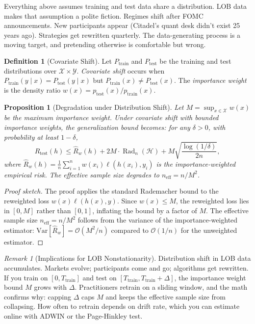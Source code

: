 \documentclass[11pt]{article}
\newtheorem{proposition}[theorem]{Proposition}
\theoremstyle{definition}
\newtheorem{definition}[theorem]{Definition}
\theoremstyle{remark}
\newtheorem{remark}[theorem]{Remark}
\newcommand{\cH}{\mathcal{H}}
\newcommand{\cO}{\mathcal{O}}
\newcommand{\cX}{\mathcal{X}}
\newcommand{\cY}{\mathcal{Y}}
\DeclareMathOperator{\Rad}{Rad}
\begin{document}
Everything above assumes training and test data share a distribution.
LOB data makes that assumption a polite fiction.
Regimes shift after FOMC announcements.
New participants appear (Citadel's quant desk didn't exist 25 years ago).
Strategies get rewritten quarterly.
The data-generating process is a moving target, and pretending otherwise is comfortable but wrong.

\begin{definition}[Covariate Shift]\label{def:covariate_shift}
Let $P_{\mathrm{train}}$ and $P_{\mathrm{test}}$ be the training and test distributions over $\cX \times \cY$.
\emph{Covariate shift} occurs when $P_{\mathrm{train}}(y \mid x) = P_{\mathrm{test}}(y \mid x)$ but $P_{\mathrm{train}}(x) \neq P_{\mathrm{test}}(x)$.
The \emph{importance weight} is the density ratio $w(x) = p_{\mathrm{test}}(x) / p_{\mathrm{train}}(x)$.
\end{definition}

\begin{proposition}[Degradation under Distribution Shift]\label{prop:shift}
Let $M = \sup_{x \in \cX} w(x)$ be the maximum importance weight.
Under covariate shift with bounded importance weights, the generalization bound becomes: for any $\delta > 0$, with probability at least $1 - \delta$,
\[
    R_{\mathrm{test}}(h) \leq \hat{R}_w(h) + 2M \cdot \Rad_n(\cH) + M\sqrt{\frac{\log(1/\delta)}{2n}},
\]
where $\hat{R}_w(h) = \frac{1}{n}\sum_{i=1}^n w(x_i) \ell(h(x_i), y_i)$ is the importance-weighted empirical risk.
The effective sample size degrades to $n_{\mathrm{eff}} = n / M^2$.
\end{proposition}

\begin{proof}[Proof sketch]
The proof applies the standard Rademacher bound to the reweighted loss $w(x)\ell(h(x),y)$.
Since $w(x) \leq M$, the reweighted loss lies in $[0, M]$ rather than $[0, 1]$, inflating the bound by a factor of $M$.
The effective sample size $n_{\mathrm{eff}} = n/M^2$ follows from the variance of the importance-weighted estimator: $\mathrm{Var}[\hat{R}_w] = \cO(M^2/n)$ compared to $\cO(1/n)$ for the unweighted estimator.
\end{proof}

\begin{remark}[Implications for LOB Nonstationarity]
Distribution shift in LOB data accumulates.
Markets evolve; participants come and go; algorithms get rewritten.
If you train on $[0, T_{\mathrm{train}}]$ and test on $[T_{\mathrm{train}}, T_{\mathrm{train}} + \Delta]$, the importance weight bound $M$ grows with $\Delta$.
Practitioners retrain on a sliding window, and the math confirms why: capping $\Delta$ caps $M$ and keeps the effective sample size from collapsing.
How often to retrain depends on drift rate, which you can estimate online with ADWIN or the Page-Hinkley test.
\end{remark}
\end{document}
